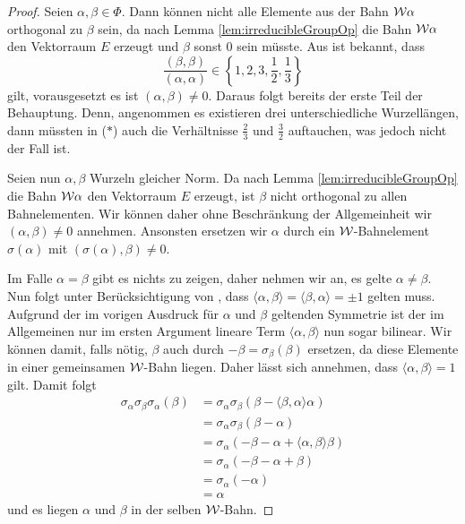 \begin{proof}
  Seien $\alpha, \beta \in \Phi$.
  Dann können nicht alle Elemente aus der Bahn $\mathcal{W}\alpha$ orthogonal zu $\beta$ sein, da nach Lemma \ref{lem:irreducibleGroupOp} die Bahn $\mathcal{W}\alpha$ den Vektorraum $E$ erzeugt und $\beta$ sonst $0$ sein müsste.
  Aus \cite[S.45]{humphreys1972introduction} ist bekannt, dass  
  \begin{displaymath}
    \frac{(\beta,\beta)}{(\alpha,\alpha)} \in \left\{1,2,3,\frac{1}{2},\frac{1}{3}\right\} \tag{$\ast$}
  \end{displaymath}
  gilt, vorausgesetzt es ist $(\alpha, \beta) \neq 0$.
  Daraus folgt bereits der erste Teil der Behauptung.
  Denn, angenommen es existieren drei unterschiedliche Wurzellängen, dann müssten in ($\ast$) auch die Verhältnisse $\tfrac{2}{3}$ und $\tfrac{3}{2}$ auftauchen, was jedoch nicht der Fall ist.

  Seien nun $\alpha, \beta$ Wurzeln gleicher Norm.
  Da nach Lemma \ref{lem:irreducibleGroupOp} die Bahn $\mathcal{W}\alpha$ den Vektorraum $E$ erzeugt, ist $\beta$ nicht orthogonal zu allen Bahnelementen.
  Wir können daher ohne Beschränkung der Allgemeinheit wir $(\alpha, \beta) \neq 0$ annehmen.
  Ansonsten ersetzen wir $\alpha$ durch ein $\mathcal{W}$\hyp{}Bahnelement $\sigma(\alpha)$ mit $(\sigma(\alpha), \beta) \neq 0$.

  Im Falle $\alpha = \beta$ gibt es nichts zu zeigen, daher nehmen wir an, es gelte $\alpha \neq \beta$.
  Nun folgt unter Berücksichtigung von \cite[S.45]{humphreys1972introduction}, dass $\langle \alpha, \beta \rangle = \langle \beta, \alpha \rangle = \pm 1$ gelten muss.
  Aufgrund der im vorigen Ausdruck für $\alpha$ und $\beta$ geltenden Symmetrie ist der im Allgemeinen nur im ersten Argument lineare Term $\langle \alpha, \beta \rangle$ nun sogar bilinear.
  Wir können damit, falls nötig, $\beta$ auch durch $-\beta = \sigma_\beta(\beta)$ ersetzen, da diese Elemente in einer gemeinsamen $\mathcal{W}$\hyp{}Bahn liegen.
  Daher lässt sich annehmen, dass $\langle \alpha, \beta \rangle = 1$ gilt.
  Damit folgt
  \begin{align*}
    \sigma_\alpha \sigma_\beta \sigma_\alpha(\beta) 
    &= \sigma_\alpha \sigma_\beta(\beta - \langle \beta, \alpha \rangle \alpha) \\
    &= \sigma_\alpha \sigma_\beta(\beta - \alpha) \\
    &= \sigma_\alpha (-\beta - \alpha + \langle \alpha, \beta \rangle \beta) \\
    &= \sigma_\alpha (-\beta - \alpha + \beta) \\
    &= \sigma_\alpha (-\alpha) \\
    &= \alpha
  \end{align*}
  und es liegen $\alpha$ und $\beta$ in der selben $\mathcal{W}$\hyp{}Bahn.
\end{proof} 

